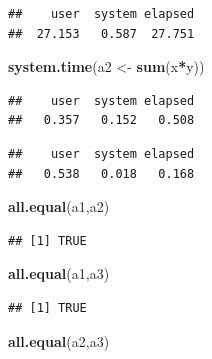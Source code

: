 \documentclass[]{book}
\newenvironment{Shaded}{\begin{snugshade}}{\end{snugshade}}
\newcommand{\KeywordTok}[1]{\textcolor[rgb]{0.13,0.29,0.53}{\textbf{#1}}}
\newcommand{\NormalTok}[1]{#1}
\newcommand{\OperatorTok}[1]{\textcolor[rgb]{0.81,0.36,0.00}{\textbf{#1}}}
\newcommand{\StringTok}[1]{\textcolor[rgb]{0.31,0.60,0.02}{#1}}
\theoremstyle{definition}
\theoremstyle{definition}
\theoremstyle{definition}
\theoremstyle{remark}
\begin{document}
\begin{verbatim}
##    user  system elapsed 
##  27.153   0.587  27.751
\end{verbatim}

\begin{Shaded}
\begin{Highlighting}[]
\KeywordTok{system.time}\NormalTok{(a2 <-}\StringTok{ }\KeywordTok{sum}\NormalTok{(x}\OperatorTok{*}\NormalTok{y))}
\end{Highlighting}
\end{Shaded}

\begin{verbatim}
##    user  system elapsed 
##   0.357   0.152   0.508
\end{verbatim}

\begin{Shaded}
\end{Shaded}

\begin{verbatim}
##    user  system elapsed 
##   0.538   0.018   0.168
\end{verbatim}

\begin{Shaded}
\begin{Highlighting}[]
\KeywordTok{all.equal}\NormalTok{(a1,a2)}
\end{Highlighting}
\end{Shaded}

\begin{verbatim}
## [1] TRUE
\end{verbatim}

\begin{Shaded}
\begin{Highlighting}[]
\KeywordTok{all.equal}\NormalTok{(a1,a3)}
\end{Highlighting}
\end{Shaded}

\begin{verbatim}
## [1] TRUE
\end{verbatim}

\begin{Shaded}
\begin{Highlighting}[]
\KeywordTok{all.equal}\NormalTok{(a2,a3)}
\end{Highlighting}
\end{Shaded}
\end{document}

